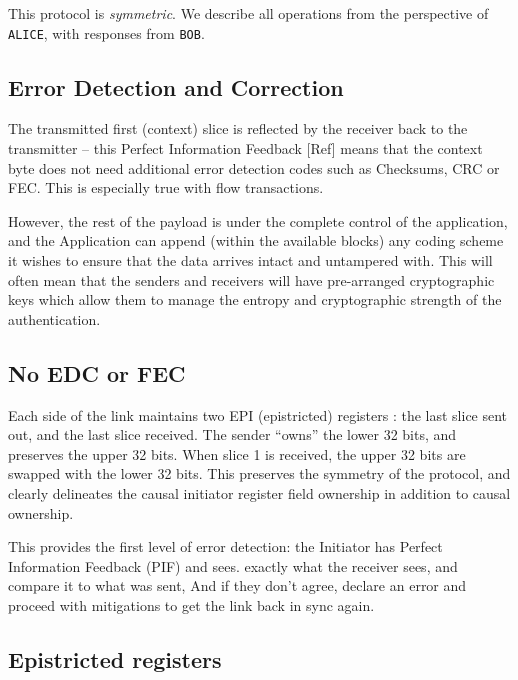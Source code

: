 \documentclass[../OAE-SPEC-MAIN.tex]{subfiles}
\begin{document}
This protocol is \emph{symmetric}. We describe all operations from the perspective of \texttt{ALICE}, with responses from \texttt{BOB}.


\subsection{Error Detection and Correction}

%

The transmitted first (context) slice is reflected by the receiver back to the transmitter -- this Perfect Information Feedback [Ref] means that the context byte does not need additional error detection codes such as Checksums, CRC or FEC. This is especially true with flow transactions. 

However, the rest of the payload is under the complete control of the application, and the Application can append (within the available blocks) any coding scheme it wishes to ensure that the data arrives intact and untampered with.  This will often mean that the senders and receivers will have pre-arranged cryptographic keys which allow them to manage the entropy and cryptographic strength of the authentication.

\subsection{No EDC or FEC}

Each side of the link maintains two EPI (epistricted) registers : the last slice sent out, and the last slice received. The sender “owns” the lower 32 bits, and preserves the upper 32 bits. When slice 1 is received, the upper 32 bits are swapped with the lower 32 bits.  This preserves the symmetry of the protocol, and clearly delineates the causal initiator register field ownership in addition to causal ownership.

This provides the first level of error detection: the Initiator has Perfect Information Feedback (PIF) and  sees. exactly what the receiver sees, and compare it to what was sent, And if they don’t agree, declare an error and proceed with mitigations to get the link back in sync again.

\subsection{Epistricted registers}
\end{document}
